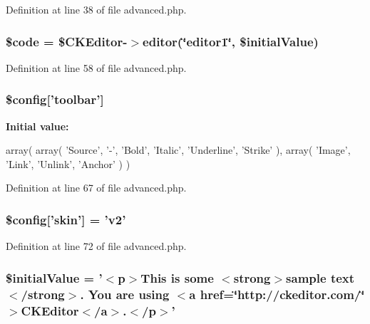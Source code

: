 Definition at line 38 of file advanced.php.

\hypertarget{advanced_8php_a7949acdaecc70b9f035c12a7069db132}{
\subsubsection[{\$code}]{\setlength{\rightskip}{0pt plus 5cm}\$code = \${\bf CKEditor}-\/$>$editor(\char`\"{}editor1\char`\"{}, \$initialValue)}}
\label{advanced_8php_a7949acdaecc70b9f035c12a7069db132}


Definition at line 58 of file advanced.php.

\hypertarget{advanced_8php_aea8fdfb38b8f02d1fc431d35e6dfc892}{
\subsubsection[{\$config}]{\setlength{\rightskip}{0pt plus 5cm}\${\bf config}\mbox{[}'toolbar'\mbox{]}}}
\label{advanced_8php_aea8fdfb38b8f02d1fc431d35e6dfc892}
{\bfseries Initial value:}
\begin{DoxyCode}
 array(
    array( 'Source', '-', 'Bold', 'Italic', 'Underline', 'Strike' ),
    array( 'Image', 'Link', 'Unlink', 'Anchor' )
)
\end{DoxyCode}


Definition at line 67 of file advanced.php.

\hypertarget{advanced_8php_af8100404abeff7893027ca7ef204e4a7}{
\subsubsection[{\$config}]{\setlength{\rightskip}{0pt plus 5cm}\${\bf config}\mbox{[}'skin'\mbox{]} = 'v2'}}
\label{advanced_8php_af8100404abeff7893027ca7ef204e4a7}


Definition at line 72 of file advanced.php.

\hypertarget{advanced_8php_ab352e6e5b00f0a2533b1b64b8306e95f}{
\subsubsection[{\$initialValue}]{\setlength{\rightskip}{0pt plus 5cm}\$initialValue = '$<$p$>$This is some $<$strong$>$sample text$<$/strong$>$. You are using $<$a href=\char`\"{}http://ckeditor.com/\char`\"{}$>$CKEditor$<$/a$>$.$<$/p$>$'}}
\label{advanced_8php_ab352e6e5b00f0a2533b1b64b8306e95f}


